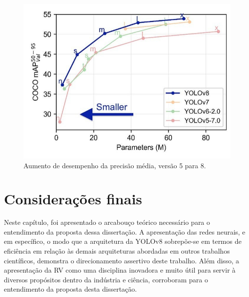 \begin{figure}[!h]
    \center
    \begin{minipage}{0.9\linewidth}
    \center
    \captionsetup{justification=centering,margin=0.5cm,font=small}
    \includegraphics[width=0.7\linewidth]{img/cap2/precisao.png}
    \caption{ Aumento de desempenho da precisão média, versão 5 para 8.  \cite{ultralytics2023yolo}} 
    \label{fig:precisao}
    \end{minipage}
\end{figure}

\section{Considerações finais}

Neste capítulo, foi apresentado o arcabouço teórico necessário para o entendimento da proposta dessa dissertação. A apresentação das redes neurais, e em específico, o modo que a arquitetura da YOLOv8 sobrepõe-se em termos de eficiência em relação às demais arquiteturas abordadas em outros trabalhos científicos, demonstra o direcionamento assertivo deste trabalho. Além disso, a apresentação da RV como uma disciplina inovadora e muito útil para servir à diversos propósitos dentro da indústria e ciência, corroboram para o entendimento da proposta desta dissertação.






